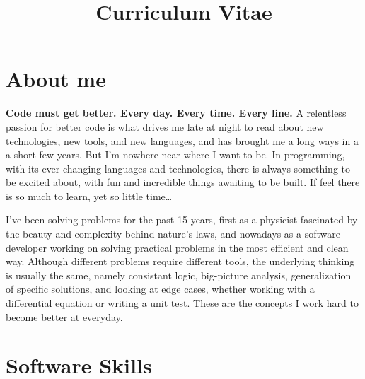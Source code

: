 \documentclass[11pt,a4paper,sans]{moderncv}        %
\title{Curriculum Vitae}                               %
\begin{document}
\makecvtitle

\section{About me}

    \textbf{Code must get better. Every day. Every time. Every line.} A relentless passion for better code is what drives
     me late at night to read about new technologies, new tools, and new languages, and has brought me a long ways in a a short few years.
     But I'm nowhere near where I want to be. In programming, with its ever-changing languages and technologies, there is always something to be excited about,
     with fun and incredible things awaiting to be built. If feel there is so much to learn, yet so little time\ldots \newline{}


    I've been solving problems for the past 15 years, first as a physicist fascinated by the beauty and complexity behind nature's laws, and nowadays as a software
    developer working on solving practical problems in the most efficient and clean way. Although different problems require different tools, the underlying thinking
    is usually the same, namely consistant logic, big-picture analysis, generalization of specific solutions, and looking at edge cases, whether working with a
    differential equation or writing a unit test. These are the concepts I work hard to become better at everyday.

\nopagebreak[4]

\section{Software Skills}
\end{document}
